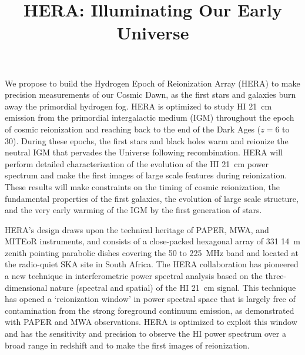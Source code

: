 \documentclass[preprint]{aastex}
\def\HI{{H{\small I }}}
\begin{document}
\pagestyle{empty}

\title{HERA: Illuminating Our Early Universe}


We propose to build the Hydrogen Epoch of Reionization Array (HERA) to make precision measurements of our Cosmic Dawn, as the first stars and galaxies burn away the primordial hydrogen fog. HERA is optimized to study \HI 21~cm emission from the primordial intergalactic medium (IGM) throughout the epoch
of cosmic reionization and reaching back to the end of the Dark Ages ($z = 6$ to 30). During these epochs, the first stars and 
black holes warm and reionize the neutral IGM that pervades the Universe following recombination. 
HERA will perform detailed characterization of the evolution of the \HI 21~cm power spectrum and make the first images of large scale features during reionization. 
These results will make constraints on the timing of cosmic reionization, 
the fundamental properties of the first galaxies, the evolution
of large scale structure, and the very early warming of the IGM by the first generation of stars. 

HERA's design draws upon the technical heritage of PAPER, MWA, and MITEoR instruments, and consists of a close-packed hexagonal array of 331 14~m zenith pointing parabolic dishes covering the 50 to 225~MHz band and located at the radio-quiet SKA site in South Africa. The HERA collaboration has pioneered a new technique in interferometric power spectral
analysis based on the three-dimensional nature (spectral and spatial) of the
\HI 21~cm signal. This technique has opened a `reionization window' in power spectral space that is 
largely free of contamination from the strong foreground continuum emission, as demonstrated with PAPER
and MWA observations. HERA is optimized to 
exploit this window and has the sensitivity and precision to observe the \HI power spectrum over a broad range in redshift and to make the first images of reionization. 

\end{document}
